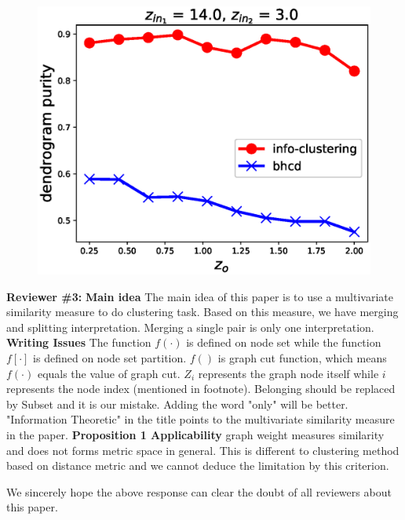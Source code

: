 \documentclass{article}
\begin{document}
\begin{subfigure}{0.33\textwidth}
	\includegraphics[width=\textwidth]{pic/z_o-dp.eps}
\end{subfigure}

\textbf{Reviewer \#3:}
\textbf{Main idea} The main idea of this paper is to use a multivariate similarity measure to do clustering task. Based on this measure, we have merging and splitting interpretation.  Merging a single pair is only one interpretation.
\textbf{Writing Issues} The function $f(\cdot)$ is defined on node set while the function $f[\cdot]$ is defined on node set partition. $f()$ is graph cut function, which means $f(\cdot)$ equals the value of graph cut. $Z_i$ represents the graph node itself while $i$ represents the node index (mentioned in footnote). Belonging should be replaced by Subset and it is our mistake. Adding the word "only" will be better.
"Information Theoretic" in the title points to the multivariate similarity measure in the paper.
\textbf{Proposition 1 Applicability} graph weight measures similarity and does not forms metric space in general. This is different to clustering method based on distance metric and we cannot deduce the limitation by this criterion.

We sincerely hope the above response can clear the doubt of all reviewers about this paper.
\end{document}
